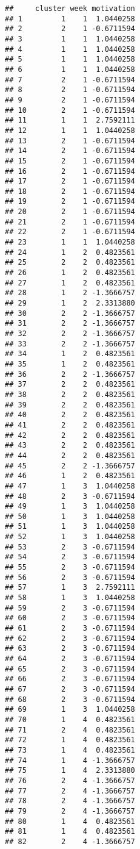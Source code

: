 \documentclass[]{article}
\begin{document}
\begin{verbatim}
##     cluster week motivation
## 1         1    1  1.0440258
## 2         2    1 -0.6711594
## 3         1    1  1.0440258
## 4         1    1  1.0440258
## 5         1    1  1.0440258
## 6         1    1  1.0440258
## 7         2    1 -0.6711594
## 8         2    1 -0.6711594
## 9         2    1 -0.6711594
## 10        2    1 -0.6711594
## 11        1    1  2.7592111
## 12        1    1  1.0440258
## 13        2    1 -0.6711594
## 14        2    1 -0.6711594
## 15        2    1 -0.6711594
## 16        2    1 -0.6711594
## 17        2    1 -0.6711594
## 18        2    1 -0.6711594
## 19        2    1 -0.6711594
## 20        2    1 -0.6711594
## 21        2    1 -0.6711594
## 22        2    1 -0.6711594
## 23        1    1  1.0440258
## 24        1    2  0.4823561
## 25        2    2  0.4823561
## 26        1    2  0.4823561
## 27        1    2  0.4823561
## 28        1    2 -1.3666757
## 29        1    2  2.3313880
## 30        2    2 -1.3666757
## 31        2    2 -1.3666757
## 32        2    2 -1.3666757
## 33        2    2 -1.3666757
## 34        1    2  0.4823561
## 35        1    2  0.4823561
## 36        2    2 -1.3666757
## 37        2    2  0.4823561
## 38        2    2  0.4823561
## 39        2    2  0.4823561
## 40        2    2  0.4823561
## 41        2    2  0.4823561
## 42        2    2  0.4823561
## 43        2    2  0.4823561
## 44        2    2  0.4823561
## 45        2    2 -1.3666757
## 46        1    2  0.4823561
## 47        1    3  1.0440258
## 48        2    3 -0.6711594
## 49        1    3  1.0440258
## 50        1    3  1.0440258
## 51        1    3  1.0440258
## 52        1    3  1.0440258
## 53        2    3 -0.6711594
## 54        2    3 -0.6711594
## 55        2    3 -0.6711594
## 56        2    3 -0.6711594
## 57        1    3  2.7592111
## 58        1    3  1.0440258
## 59        2    3 -0.6711594
## 60        2    3 -0.6711594
## 61        2    3 -0.6711594
## 62        2    3 -0.6711594
## 63        2    3 -0.6711594
## 64        2    3 -0.6711594
## 65        2    3 -0.6711594
## 66        2    3 -0.6711594
## 67        2    3 -0.6711594
## 68        2    3 -0.6711594
## 69        1    3  1.0440258
## 70        1    4  0.4823561
## 71        2    4  0.4823561
## 72        1    4  0.4823561
## 73        1    4  0.4823561
## 74        1    4 -1.3666757
## 75        1    4  2.3313880
## 76        2    4 -1.3666757
## 77        2    4 -1.3666757
## 78        2    4 -1.3666757
## 79        2    4 -1.3666757
## 80        1    4  0.4823561
## 81        1    4  0.4823561
## 82        2    4 -1.3666757

\end{verbatim}
\end{document}
